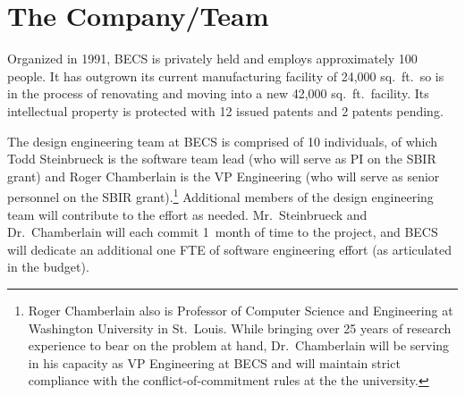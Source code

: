 \section{The Company/Team}
\label{sec:team}

%

Organized in 1991, BECS is privately held and employs approximately 100
people. It has outgrown its current
manufacturing facility of 24,000 sq.~ft.\ so is in the process of
renovating and moving into a new 42,000 sq.~ft.\ facility.
Its intellectual property is protected with 12 issued patents and
2 patents pending.

The design engineering team at BECS is comprised of 10 individuals, of
which Todd Steinbrueck is the software team lead (who will serve as
PI on the SBIR grant) and Roger Chamberlain is the VP Engineering (who
will serve as senior personnel on the SBIR grant).\footnote{Roger Chamberlain
also is Professor of Computer Science and Engineering at Washington
University in St.~Louis. While bringing over 25 years of research
experience to bear on the problem at hand, Dr.~Chamberlain will be
serving in his capacity as VP Engineering at BECS and will maintain
strict compliance with the conflict-of-commitment rules at the the university.}
Additional members of the design engineering team will contribute to
the effort as needed. Mr.~Steinbrueck and Dr.~Chamberlain will each
commit 1~month of time to the project, and BECS will dedicate an additional
one FTE of software engineering effort (as articulated in the budget).

